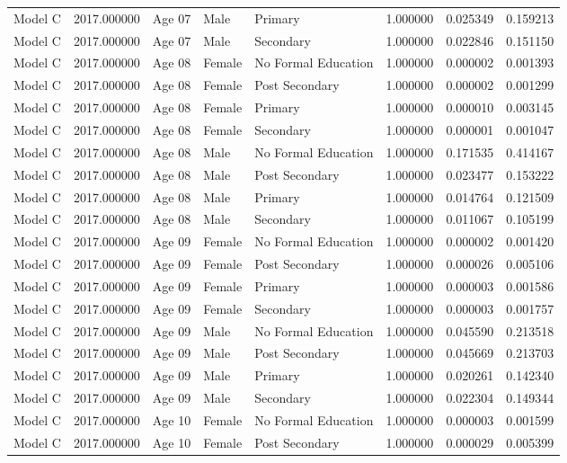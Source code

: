 \begin{table}[ht]
\begin{tabular}{lrlllrrr}
Model C & 2017.000000 & Age 07 & Male & Primary & 1.000000 & 0.025349 & 0.159213 \\
Model C & 2017.000000 & Age 07 & Male & Secondary & 1.000000 & 0.022846 & 0.151150 \\
Model C & 2017.000000 & Age 08 & Female & No Formal Education & 1.000000 & 0.000002 & 0.001393 \\
Model C & 2017.000000 & Age 08 & Female & Post Secondary & 1.000000 & 0.000002 & 0.001299 \\
Model C & 2017.000000 & Age 08 & Female & Primary & 1.000000 & 0.000010 & 0.003145 \\
Model C & 2017.000000 & Age 08 & Female & Secondary & 1.000000 & 0.000001 & 0.001047 \\
Model C & 2017.000000 & Age 08 & Male & No Formal Education & 1.000000 & 0.171535 & 0.414167 \\
Model C & 2017.000000 & Age 08 & Male & Post Secondary & 1.000000 & 0.023477 & 0.153222 \\
Model C & 2017.000000 & Age 08 & Male & Primary & 1.000000 & 0.014764 & 0.121509 \\
Model C & 2017.000000 & Age 08 & Male & Secondary & 1.000000 & 0.011067 & 0.105199 \\
Model C & 2017.000000 & Age 09 & Female & No Formal Education & 1.000000 & 0.000002 & 0.001420 \\
Model C & 2017.000000 & Age 09 & Female & Post Secondary & 1.000000 & 0.000026 & 0.005106 \\
Model C & 2017.000000 & Age 09 & Female & Primary & 1.000000 & 0.000003 & 0.001586 \\
Model C & 2017.000000 & Age 09 & Female & Secondary & 1.000000 & 0.000003 & 0.001757 \\
Model C & 2017.000000 & Age 09 & Male & No Formal Education & 1.000000 & 0.045590 & 0.213518 \\
Model C & 2017.000000 & Age 09 & Male & Post Secondary & 1.000000 & 0.045669 & 0.213703 \\
Model C & 2017.000000 & Age 09 & Male & Primary & 1.000000 & 0.020261 & 0.142340 \\
Model C & 2017.000000 & Age 09 & Male & Secondary & 1.000000 & 0.022304 & 0.149344 \\
Model C & 2017.000000 & Age 10 & Female & No Formal Education & 1.000000 & 0.000003 & 0.001599 \\
Model C & 2017.000000 & Age 10 & Female & Post Secondary & 1.000000 & 0.000029 & 0.005399 \\

\end{tabular}
\end{table}
